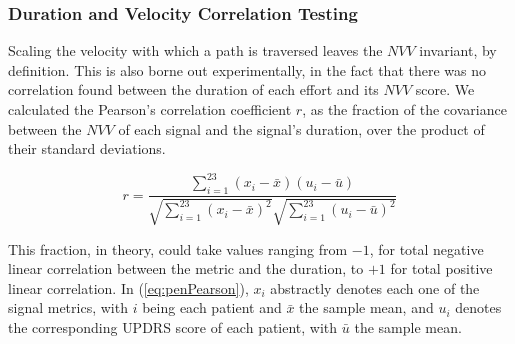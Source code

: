 
\subsubsection{Duration and Velocity Correlation Testing}
\label{subsubsec:PenCTDurVelCorTesting}
Scaling the velocity with which a path is traversed leaves the $NVV$ invariant, by definition. This is also borne out experimentally, in the fact that there was no correlation found between the duration of each effort and its $NVV$ score. We calculated the Pearson's correlation coefficient $r$, as the fraction of the covariance between the $NVV$ of each signal and the signal's duration, over the product of their standard deviations. 

\begin{equation} \label{eq:penPearson}
r = \frac{ \sum_{i=1}^{23} (x_{i} - \bar{x})(u_{i} - \bar{u}) } 
		 { \sqrt{\sum_{i=1}^{23} (x_{i} - \bar{x})^{2}} \sqrt{\sum_{i=1}^{23} (u_{i} - \bar{u})^{2}} }
\end{equation}

\noindent
This fraction, in theory, could take values ranging from $-1$, for total negative linear correlation between the metric and the duration, to $+1$ for total positive linear correlation. In (\ref{eq:penPearson}), $x_{i}$ abstractly denotes each one of the signal metrics, with $i$ being each patient and $\bar{x}$ the sample mean, and $u_{i}$ denotes the corresponding \gls{UPDRS} score of each patient, with $\bar{u}$ the sample mean.


